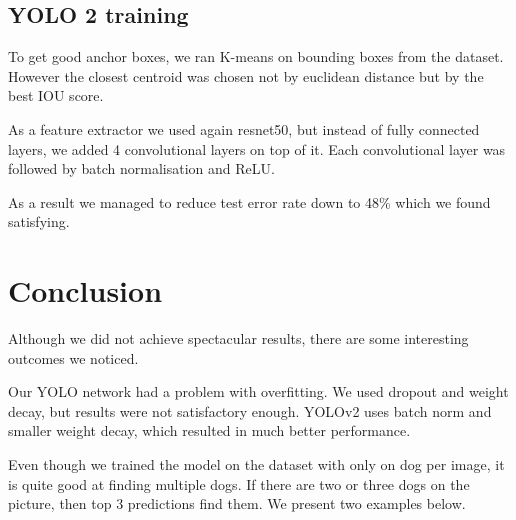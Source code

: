 \documentclass{article}
\begin{document}
\subsection*{YOLO 2 training}

To get good anchor boxes, we ran K-means on bounding boxes from the dataset. However the closest centroid was chosen not by euclidean distance but by the best IOU score. 

As a feature extractor we used again resnet50, but instead of fully connected layers, we added 4 convolutional layers on top of it. Each convolutional layer was followed by batch normalisation and ReLU.

As a result we managed to reduce test error rate down to 48\% which we found satisfying.


\section*{Conclusion}

Although we did not achieve spectacular results, there are some interesting outcomes we noticed.

Our YOLO network had a problem with overfitting. We used dropout and weight decay, but results were not satisfactory enough. YOLOv2 uses batch norm and smaller weight decay, which resulted in much better performance.

Even though we trained the model on the dataset with only on dog per image, it is quite good at finding multiple dogs. If there are two or three dogs on the picture, then top 3 predictions find them. We present two examples below.
\end{document}
